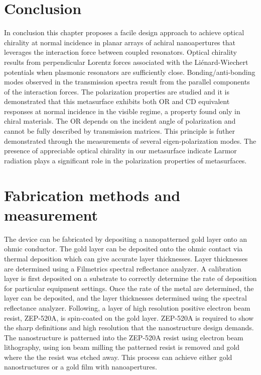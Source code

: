 \section{Conclusion}
In conclusion this chapter proposes a facile design approach to achieve optical chirality at normal incidence in planar arrays of achiral nanoapertures that leverages the interaction force between coupled resonators. Optical chirality results from perpendicular Lorentz forces associated with the Li\'{e}nard-Wiechert potentials when plasmonic resonators are sufficiently close. Bonding/anti-bonding modes observed in the transmission spectra result from the parallel components of the interaction forces. The polarization properties are studied and it is demonstrated that this metasurface exhibits both OR and CD equivalent responses at normal incidence in the visible regime, a property found only in chiral materials. The OR depends on the incident angle of polarization and cannot be fully described by transmission matrices. This principle is futher demonstrated through the measurements of several eigen-polarization modes. The presence of appreciable optical chirality in our metasurface indicate Larmor radiation plays a significant role in the polarization properties of metasurfaces.

\section{Fabrication methods and measurement}
\par The device can be fabricated by depositing a nanopatterned gold layer onto an ohmic conductor. The gold layer can be deposited onto the ohmic contact via thermal deposition which can give accurate layer thicknesses. Layer thicknesses are determined using a Filmetrics spectral reflectance analyzer. A calibration layer is first deposited on a substrate to correctly determine the rate of deposition for particular equipment settings. Once the rate of the metal are determined, the layer can be deposited, and the layer thicknesses determined using the spectral reflectance analyzer. Following, a layer of high resolution positive electron beam resist, ZEP-520A, is spin-coated on the gold layer. ZEP-520A is required to show the sharp definitions and high resolution that the nanostructure design demands. The nanostructure is patterned into the ZEP-520A resist using electron beam lithography, using ion beam milling the patterned resist is removed and gold where the the resist was etched away. This process can achieve either gold nanostructures or a gold film with nanoapertures. 

